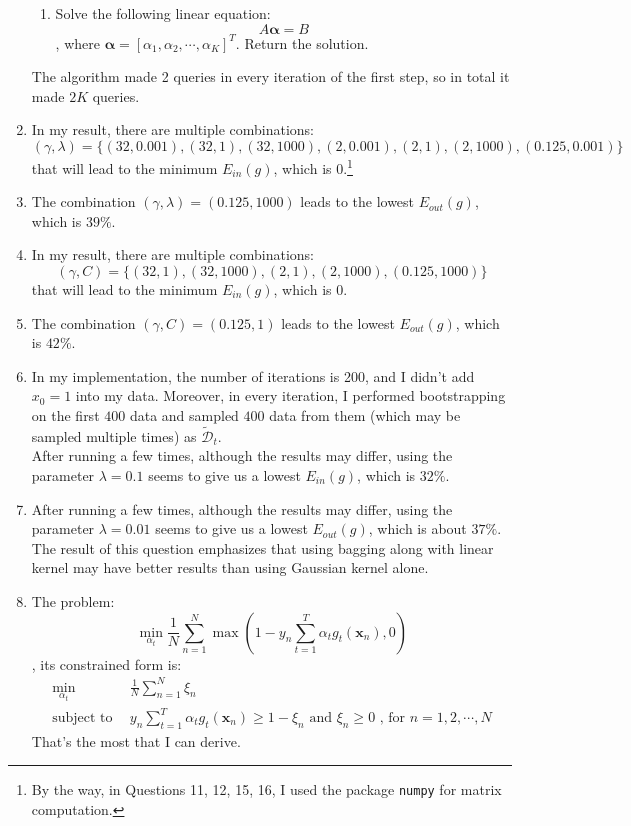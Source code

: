 \documentclass[11pt]{article}
\begin{document}
\begin{enumerate}[label=\textbf{\arabic*}.]
\begin{enumerate}
      \item Solve the following linear equation:
      \[A\bm{\alpha}=B\], where $\bm{\alpha} = [\alpha_1, \alpha_2, \cdots, \alpha_K]^T$. Return the solution.
    \end{enumerate}
    The algorithm made 2 queries in every iteration of the first step, so in total it made $2K$ queries.

    \item In my result, there are multiple combinations: \[(\gamma, \lambda) = \{(32, 0.001), (32, 1), (32, 1000), (2, 0.001), (2, 1), (2, 1000), (0.125, 0.001)\}\] that will lead to the minimum $E_{in}(g)$, which is 0.\footnote{By the way, in Questions 11, 12, 15, 16, I used the package \texttt{numpy} for matrix computation.}

    \item The combination $(\gamma, \lambda) = (0.125, 1000)$ leads to the lowest $E_{out}(g)$, which is $39\%$.

    \item In my result, there are multiple combinations: \[(\gamma, C) = \{(32, 1), (32, 1000), (2, 1), (2, 1000), (0.125, 1000)\}\] that will lead to the minimum $E_{in}(g)$, which is 0.

    \item The combination $(\gamma, C) = (0.125, 1)$ leads to the lowest $E_{out}(g)$, which is $42\%$.

    \item In my implementation, the number of iterations is 200, and I didn't add $x_0=1$ into my data. Moreover, in every iteration, I performed bootstrapping on the first $400$ data and sampled $400$ data from them (which may be sampled multiple times) as $\mathcal{\tilde{D}}_t$.\\
    After running a few times, although the results may differ, using the parameter $\lambda = 0.1$ seems to give us a lowest $E_{in}(g)$, which is $32\%$.

    \item After running a few times, although the results may differ, using the parameter $\lambda = 0.01$ seems to give us a lowest $E_{out}(g)$, which is about $37\%$.\\
    The result of this question emphasizes that using bagging along with linear kernel may have better results than using Gaussian kernel alone.

    

    \item The problem:
    \[\underset{\alpha_t}\min \frac{1}{N} \sum_{n=1}^N \max \left( 1-y_n \sum_{t=1}^T \alpha_t g_t(\mathbf{x}_n), 0\right)\]
    , its constrained form is: 
    \begin{align*}
    \underset{\alpha_t}\min \ \ &\frac{1}{N} \sum_{n=1}^N \xi_n\\ 
    \text{subject to}\ \  &  y_n \sum_{t=1}^T \alpha_t g_t(\mathbf{x}_n) \geq 1 - \xi_n \text{ and }\xi_n \geq 0 \text { , for } n=1, 2, \cdots, N 
    \end{align*}
    That's the most that I can derive.
	


\end{enumerate}
\end{document}
